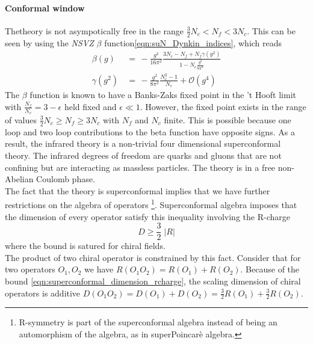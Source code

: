 \paragraph{\textbf{Conformal window}}
Thetheory is not asympotically free in the range $\frac{3}{2} N_c < N_f < 3 N_c$. This can be seen by using the \emph{NSVZ} $\beta$ function\eqref{eqn:suN_Dynkin_indices}, which reads
\begin{align}
 \beta (g) & \, = \,- \frac{g^3}{16 \pi^2} \frac{3 N_c - N_f + N_f \gamma(g^2)}{1 - N_c \frac{g^2}{8 \pi^2}} \\
\gamma(g^2) &  \,= \, - \frac{g^2}{8 \pi^2} \frac{N_c^2 - 1}{N_c} + \mathcal{O} (g^4)
\end{align} 
The $\beta$ function is known to have a Banks-Zaks fixed point \cite{Banks:1981nn} in the 't Hooft limit with $\frac{N_f}{N_c} = 3 - \epsilon$ held fixed and $\epsilon \ll 1$.
However, the fixed point exists in the range of values $\frac{3}{2} N_c \geq N_f \geq  3 N_c$ with $N_f$ and $N_c$ finite.
This is possible because one loop and two loop contributions to the beta function have opposite signs.
As a result, the infrared theory is a non-trivial four dimensional superconformal theory. 
The infrared degrees of freedom are quarks and gluons that are not confining but are interacting as massless particles.
The theory is in a free non-Abelian Coulomb phase.
\\
The fact that the theory is superconformal implies that we have further restrictions on the algebra of operators \footnote{
	R-symmetry is part of the superconformal algebra instead of being an automorphism of the algebra, as in superPoincarè algebra.  
	}.
Superconformal algebra imposes that the dimension of every operator satisfy this inequality involving the R-charge
\begin{equation}
 D \geq \frac{3}{2} \; | R |
 \label{eqn:superconformal_dimension_rcharge}
\end{equation}
where the bound is satured for chiral fields.\\
The product of two chiral operator is constrained by this fact.
Consider that for two operators $O_1,O_2$ we have $R( O_1 O_2) = R(O_1) + R(O_2)$.
Because of the bound \eqref{eqn:superconformal_dimension_rcharge}, the scaling dimension of chiral operators is additive $D(O_1 O_2) = D(O_1) + D(O_2) = \frac{3}{2} R(O_1) + \frac{3}{2} R(O_2)$.
